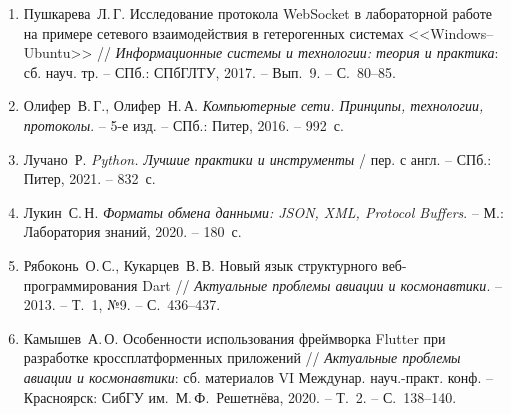 \documentclass[14pt, russian]{scrartcl}
\begin{document}
\begin{enumerate}
  \item Пушкарева~Л.\,Г. Исследование протокола WebSocket в лабораторной
  работе на примере сетевого взаимодействия в гетерогенных системах
  <<Windows–Ubuntu>> // \textit{Информационные системы и технологии: теория
  и практика}: сб. науч. тр. – СПб.: СПбГЛТУ, 2017. – Вып.~9. – С.~80–85.

  \item Олифер~В.\,Г., Олифер~Н.\,А. \textit{Компьютерные сети. Принципы,
  технологии, протоколы}. – 5-е изд. – СПб.: Питер, 2016. – 992~с.

  \item Лучано~Р. \textit{Python. Лучшие практики и инструменты} / пер. с англ. –
  СПб.: Питер, 2021. – 832~с.

  \item Лукин~С.\,Н. \textit{Форматы обмена данными: JSON, XML, Protocol Buffers}.
  – М.: Лаборатория знаний, 2020. – 180~с.

  \item Рябоконь~О.\,С., Кукарцев~В.\,В. Новый язык структурного
  веб-программирования Dart // \textit{Актуальные проблемы авиации и
  космонавтики}. – 2013. – Т.~1, №9. – С.~436–437.

  \item Камышев~А.\,О. Особенности использования фреймворка Flutter при
  разработке кроссплатформенных приложений // \textit{Актуальные проблемы
  авиации и космонавтики}: сб. материалов VI Между\-нар. науч.-практ. конф. –
  Красноярск: СибГУ им.~М.\,Ф.~Решетнёва, 2020. – Т.~2. – С.~138–140.
\end{enumerate}
\end{document}
